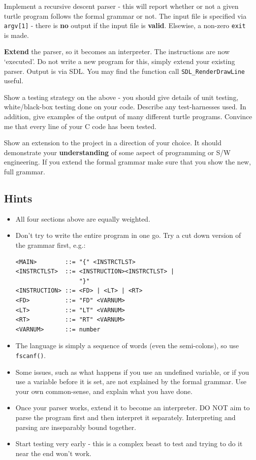 

\begin{exercise}
Implement a recursive descent parser - this will report
whether or not a given turtle program follows the formal grammar or not.
The input file is specified via \verb^argv[1]^ - there is {\bf no} output if
the input file is {\bf valid}. Elsewise, a non-zero \verb^exit^ is made.

{\bf Extend} the parser, so it becomes an interpreter. The instructions are
now `executed'. Do not write a new program for this, simply extend your
existing parser. Output is via SDL. You may find the function call
\verb^SDL_RenderDrawLine^ useful.

Show a testing strategy on the above -
you should give details of
unit testing, white/black-box testing done on your code. Describe any
test-harnesses used. In addition, give examples of the output of many different
turtle programs. Convince me that every line of your C code
has been tested.

Show an extension to the project in a direction of
your choice. It should demonstrate your {\bf understanding} of some aspect
of programming or S/W engineering. If you extend the formal grammar
make sure that you show the new, full grammar.

\subsection*{Hints}
\begin{itemize}
\item All four sections above are equally weighted.
\item Don't try to write the entire program in one go. Try a cut
down version of the grammar first, e.g.:
{\small
\begin{verbatim}
<MAIN>        ::= "{" <INSTRCTLST>
<INSTRCTLST>  ::= <INSTRUCTION><INSTRCTLST> |
                  "}"
<INSTRUCTION> ::= <FD> | <LT> | <RT>
<FD>          ::= "FD" <VARNUM>
<LT>          ::= "LT" <VARNUM>
<RT>          ::= "RT" <VARNUM>
<VARNUM>      ::= number
\end{verbatim}
}
\item The language is simply a sequence of words (even the semi-colons),
so use \verb^fscanf()^.
\item Some issues, such as what happens if you use an undefined variable,
or if you use a variable before it is set, are not explained by the formal
grammar. Use your own common-sense, and explain what you have done.
\item Once your parser works, extend it to become an interpreter. DO NOT
aim to parse the program first and then interpret it separately. Interpreting
and parsing are inseparably bound together.
\item Start testing very early - this is a complex beast to test and trying to
do it near the end won't work.
\end{itemize}


\end{exercise}
